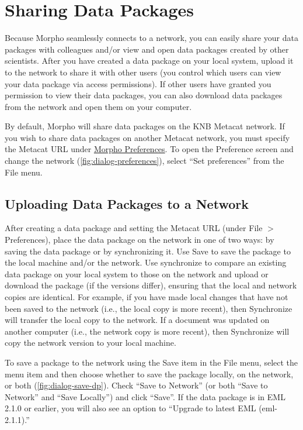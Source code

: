 \section{Sharing Data Packages} \label{sec:sharing}

Because Morpho seamlessly connects to a network, you can easily share
your data packages with colleagues and/or view and open data packages
created by other scientists. After you have created a data package on
your local system, upload it to the network to share it with other users
(you control which users can view your data package via access
permissions). If other users have granted you permission to view their
data packages, you can also download data packages from the network and
open them on your computer.

By default, Morpho will share data packages on the KNB Metacat network.
If you wish to share data packages on another Metacat network, you must
specify the Metacat URL under \hyperref[sec:preferences]{Morpho
Preferences}. To open the Preference screen and change the network
(\autoref{fig:dialog-preferences}), select ``Set preferences'' from the
File menu.

\subsection{Uploading Data Packages to a Network} \label{sec:uploading}

After creating a data package and setting the Metacat URL (under File
$>$ Preferences), place the data package on the network in one of two
ways: by saving the data package or by synchronizing it. Use Save to
save the package to the local machine and/or the network. Use
synchronize to compare an existing data package on your local system to
those on the network and upload or download the package (if the versions
differ), ensuring that the local and network copies are identical. For
example, if you have made local changes that have not been saved to the
network (i.e., the local copy is more recent), then Synchronize will
transfer the local copy to the network. If a document was updated on
another computer (i.e., the network copy is more recent), then
Synchronize will copy the network version to your local machine.

To save a package to the network using the Save item in the File menu,
select the menu item and then choose whether to save the package
locally, on the network, or both (\autoref{fig:dialog-save-dp}).  Check
``Save to Network'' (or both ``Save to Network'' and ``Save Locally'')
and click ``Save''. If the data package is in EML 2.1.0 or earlier, you
will also see an option to ``Upgrade to latest EML (eml-2.1.1).'' 

